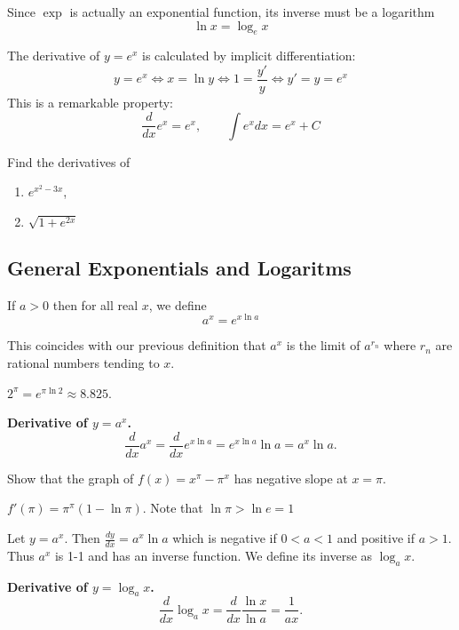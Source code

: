 \documentclass[../main.tex]{subfiles}
\begin{document}

  Since $\exp$ is actually an exponential function, its inverse must be a logarithm
  \[
    \ln x = \log_e x
  \]

  The derivative of $y = e^x$ is calculated by implicit differentiation:
  \[
    y = e^x \iff
    x = \ln y \iff
    1 = \frac{y'}{y} \iff
    y' = y = e^x
  \]
  This is a remarkable property:
  \[
    \frac{d}{dx} e^x = e^x, \qquad \int e^x dx = e^x + C
  \]

  \begin{example}
    Find the derivatives of
    \begin{enumerate}
      \item $e^{x^2-3x}$,
      \item $\sqrt{1+e^{2x}}$
    \end{enumerate}
  \end{example}

  \subsection*{General Exponentials and Logaritms}
  \begin{definition}
    If $a>0$ then for all real $x$, we define
    \[
      a^x = e^{x \ln a}
    \]
  \end{definition}
  This coincides with our previous definition that $a^x$ is the limit of $a^{r_n}$ where $r_n$ are rational numbers tending to $x$.

  \begin{example}
    $2^{\pi} = e^{\pi \ln 2} \approx 8.825$.
  \end{example}

  \textbf{Derivative of $y=a^x$.}
  \[
    \frac{d}{dx} a^x = \frac{d}{dx} e^{x \ln a} = e^{x \ln a} \ln a = a^x \ln a.
  \]

  \begin{example}
    Show that the graph of $f(x) = x^{\pi} - \pi^x$ has negative slope at $x = \pi$.
  \end{example}
  \begin{solution}
    $f'(\pi) = \pi^{\pi} (1- \ln \pi)$. Note that $\ln \pi > \ln e = 1$
  \end{solution}

  \begin{definition}
    Let $y = a^x$. Then $\frac{dy}{dx} = a^x \ln a$ which is negative if $0<a<1$ and positive if $a>1$. Thus $a^x$ is 1-1 and has an inverse function. We define its inverse as $\log_a x$.
  \end{definition}
  \textbf{Derivative of $y=\log_a x$.}
  \[
    \frac{d}{dx} \log_a x = \frac{d}{dx} \frac{\ln x}{\ln a} = \frac{1}{a x}.
  \]
\end{document}
